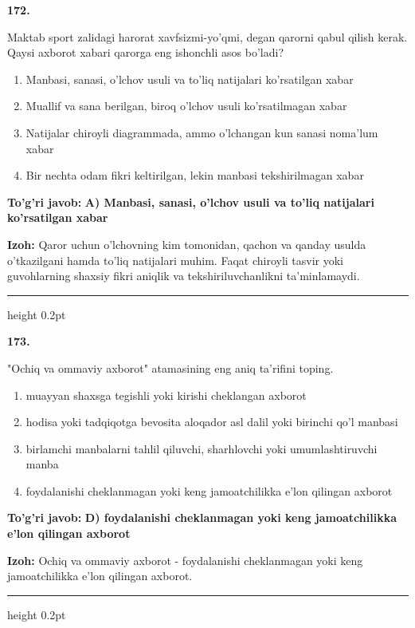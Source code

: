 \documentclass[10pt,a4paper,oneside]{article}
\begin{document}
\noindent\textbf{\color{ink}172.}
\par
Maktab sport zalidagi harorat xavfsizmi-yo'qmi, degan qarorni qabul qilish kerak. Qaysi axborot xabari qarorga eng ishonchli asos bo'ladi?
\begin{enumerate}[label=\Alph*),leftmargin=9mm]
\item Manbasi, sanasi, o'lchov usuli va to'liq natijalari ko'rsatilgan xabar
\item Muallif va sana berilgan, biroq o'lchov usuli ko'rsatilmagan xabar
\item Natijalar chiroyli diagrammada, ammo o'lchangan kun sanasi noma'lum xabar
\item Bir nechta odam fikri keltirilgan, lekin manbasi tekshirilmagan xabar
\end{enumerate}
\begin{tcolorbox}[enhanced,breakable,colback=teal!4,colframe=teal!50!black,boxrule=0.5pt,arc=1.1mm,left=3mm,right=3mm,top=1.7mm,bottom=1.7mm,before skip=2mm,after skip=2mm]
\textbf{\color{teal}To'g'ri javob:} \textbf{A) Manbasi, sanasi, o'lchov usuli va to'liq natijalari ko'rsatilgan xabar}
\par\smallskip
\textbf{Izoh:} Qaror uchun o'lchovning kim tomonidan, qachon va qanday usulda o'tkazilgani hamda to'liq natijalari muhim. Faqat chiroyli tasvir yoki guvohlarning shaxsiy fikri aniqlik va tekshiriluvchanlikni ta'minlamaydi.
\end{tcolorbox}
\vspace{2mm}\hrule height 0.2pt \vspace{3mm}

\noindent\textbf{\color{ink}173.}
\par
"Ochiq va ommaviy axborot" atamasining eng aniq ta'rifini toping.
\begin{enumerate}[label=\Alph*),leftmargin=9mm]
\item muayyan shaxsga tegishli yoki kirishi cheklangan axborot
\item hodisa yoki tadqiqotga bevosita aloqador asl dalil yoki birinchi qo'l manbasi
\item birlamchi manbalarni tahlil qiluvchi, sharhlovchi yoki umumlashtiruvchi manba
\item foydalanishi cheklanmagan yoki keng jamoatchilikka e'lon qilingan axborot
\end{enumerate}
\begin{tcolorbox}[enhanced,breakable,colback=teal!4,colframe=teal!50!black,boxrule=0.5pt,arc=1.1mm,left=3mm,right=3mm,top=1.7mm,bottom=1.7mm,before skip=2mm,after skip=2mm]
\textbf{\color{teal}To'g'ri javob:} \textbf{D) foydalanishi cheklanmagan yoki keng jamoatchilikka e'lon qilingan axborot}
\par\smallskip
\textbf{Izoh:} Ochiq va ommaviy axborot - foydalanishi cheklanmagan yoki keng jamoatchilikka e'lon qilingan axborot.
\end{tcolorbox}
\vspace{2mm}\hrule height 0.2pt \vspace{3mm}
\end{document}
